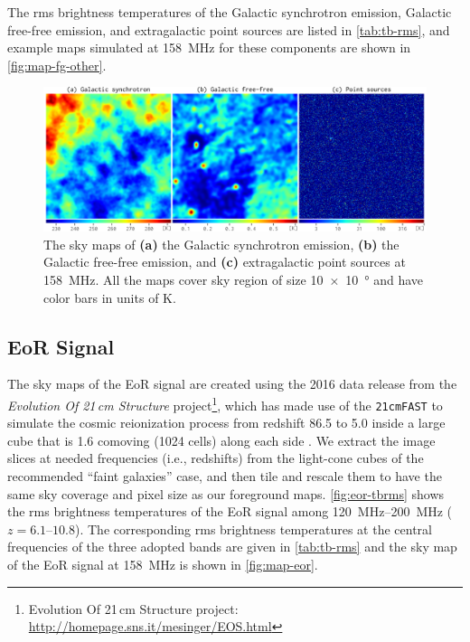 \documentclass[twocolumn]{aastex62}
\begin{document}
The rms brightness temperatures of the Galactic synchrotron emission,
Galactic free-free emission, and extragalactic point sources are listed
in \autoref{tab:tb-rms}, and example maps simulated at \SI{158}{\MHz}
for these components are shown in \autoref{fig:map-fg-other}.

\begin{figure}
  \centering
  \includegraphics[width=\textwidth]{foregrounds-f158}
  \caption{\label{fig:map-fg-other}%
    The sky maps of
    \textbf{(a)} the Galactic synchrotron emission,
    \textbf{(b)} the Galactic free-free emission, and
    \textbf{(c)} extragalactic point sources
    at \SI{158}{\MHz}.
    All the maps cover sky region of size
    \SI[product-units=repeat]{10 x 10}{\degree}
    and have color bars in units of \si{\kelvin}.
  }
\end{figure}


\subsection{EoR Signal}
\label{sec:eor-signal}

The sky maps of the EoR signal are created using the 2016 data release
from the \emph{Evolution Of 21\,cm Structure} project\footnote{%
  Evolution Of 21\,cm Structure project:
  \url{http://homepage.sns.it/mesinger/EOS.html}},
which has made use of the \texttt{21cmFAST} to simulate the cosmic
reionization process from redshift 86.5 to 5.0 inside a large cube that is
1.6 comoving \si{\Gpc} (1024 cells) along each side \citep{mesinger2016}.
We extract the image slices at needed frequencies (i.e., redshifts) from
the light-cone cubes of the recommended \enquote{faint galaxies} case,
and then tile and rescale them to have the same sky coverage and
pixel size as our foreground maps.
\autoref{fig:eor-tbrms} shows the rms brightness temperatures of the
EoR signal among \SIrange{120}{200}{\MHz} ($z = \numrange{6.1}{10.8}$).
The corresponding rms brightness temperatures at the central
frequencies of the three adopted bands are given in \autoref{tab:tb-rms}
and the sky map of the EoR signal at \SI{158}{\MHz} is shown in
\autoref{fig:map-eor}.
\end{document}
